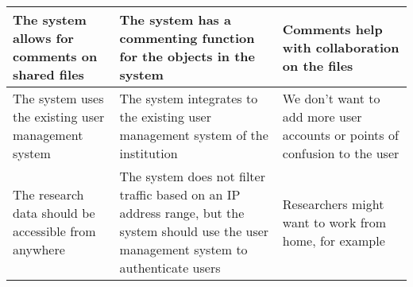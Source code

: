 \begin{tabularx}{\textwidth}{| >{\raggedright}p{3cm} | >{\raggedright}p{3cm} | X |}
    \hline
    The system allows for comments on shared files &The system has a commenting function for the objects in the system & Comments help with collaboration on the files\\
    \hline
    \rowcolor{Gray}
    The system uses the existing user management system &The system integrates to the existing user management system of the institution &We don’t want to add more user accounts or points of confusion to the user\\
    \hline
    The research data should be accessible from anywhere  &The system does not filter traffic based on an IP address range, but the system should use the user management system to authenticate users  & Researchers might want to work from home, for example\\
    \hline
\end{tabularx}
